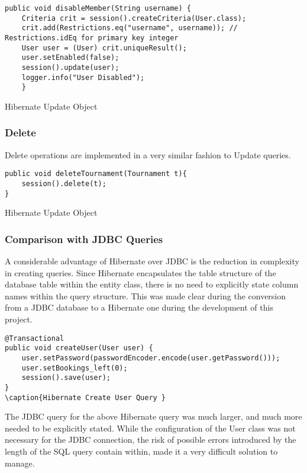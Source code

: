 \begin{table}[H]
\begin{lstlisting}
public void disableMember(String username) {
	Criteria crit = session().createCriteria(User.class);
	crit.add(Restrictions.eq("username", username)); // Restrictions.idEq for primary key integer
	User user = (User) crit.uniqueResult();
	user.setEnabled(false);
	session().update(user);
	logger.info("User Disabled");
	}
\end{lstlisting}
\caption{Hibernate Update Object }
\end{table}

\subsubsection{Delete}

Delete operations are implemented in a very similar fashion to Update queries. 

\begin{table}[H]
\begin{lstlisting}
public void deleteTournament(Tournament t){
	session().delete(t);
}
\end{lstlisting}
\caption{Hibernate Update Object }
\end{table}


\subsubsection{Comparison with JDBC Queries}

A considerable advantage of Hibernate over JDBC is the reduction in complexity in creating queries. Since Hibernate encapsulates the table structure of the database table within the entity class, there is no need to explicitly state column names within the query structure. This was made clear during the conversion from a JDBC database to a Hibernate one during the development of this project.

\begin{table}[H]
\begin{lstlisting}
@Transactional
public void createUser(User user) {
	user.setPassword(passwordEncoder.encode(user.getPassword()));
	user.setBookings_left(0);
	session().save(user);
}
\caption{Hibernate Create User Query }
\end{lstlisting}
\end{table}

The JDBC query for the above Hibernate query was much larger, and much more needed to be explicitly stated. While the configuration of the User class was not necessary for the JDBC connection, the risk of possible errors introduced by the length of the SQL query contain within, made it a very difficult solution to manage.

